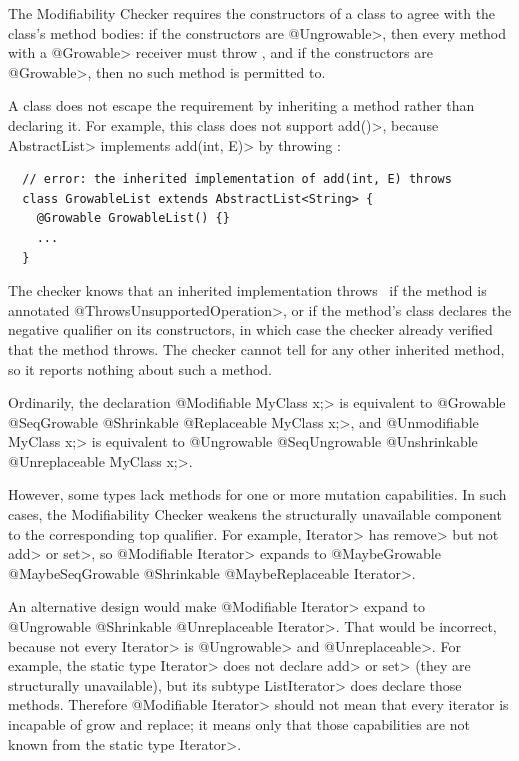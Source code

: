 
The Modifiability Checker requires the constructors of a class to agree with
the class's method bodies:  if the constructors are \<@Ungrowable>, then every
method with a \<@Growable> receiver must throw \UnsupportedOperationException,
and if the constructors are \<@Growable>, then no such method is permitted to.

A class does not escape the requirement by inheriting a method rather than
declaring it.  For example, this class does not support \<add()>, because
\<AbstractList> implements \<add(int, E)> by throwing
\UnsupportedOperationException:

\begin{Verbatim}
  // error: the inherited implementation of add(int, E) throws
  class GrowableList extends AbstractList<String> {
    @Growable GrowableList() {}
    ...
  }
\end{Verbatim}

The checker knows that an inherited implementation throws
\UnsupportedOperationException\ if the method is annotated
\<@ThrowsUnsupportedOperation>, or if the method's class declares the negative
qualifier on its constructors, in which case the checker already verified that
the method throws.  The checker cannot tell for any other inherited method, so
it reports nothing about such a method.


Ordinarily, the declaration
\<@Modifiable MyClass x;> is equivalent to
\<@Growable @SeqGrowable @Shrinkable @Replaceable MyClass x;>,
and
\<@Unmodifiable MyClass x;> is equivalent to
\<@Ungrowable @SeqUngrowable @Unshrinkable @Unreplaceable MyClass x;>.

However, some types lack methods for one or more mutation
capabilities.  In such cases, the Modifiability Checker weakens the
structurally unavailable component to the corresponding top qualifier.
For example, \<Iterator> has
\<remove> but not \<add> or \<set>, so \<@Modifiable Iterator> expands to
\<@MaybeGrowable @MaybeSeqGrowable @Shrinkable @MaybeReplaceable Iterator>.



An alternative design would make \<@Modifiable Iterator> expand to
\<@Ungrowable @Shrinkable @Unreplaceable Iterator>.
That would be incorrect, because not every \<Iterator> is \<@Ungrowable> and \<@Unreplaceable>.
For example, the static type \<Iterator> does not declare \<add> or \<set>
(they are structurally unavailable), but its subtype
\<ListIterator> does declare those methods.
Therefore \<@Modifiable Iterator> should not mean that every
iterator is incapable of grow and replace; it means only that those capabilities
are not known from the static type \<Iterator>.


